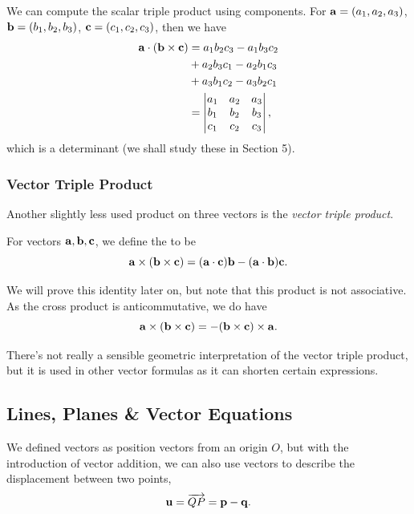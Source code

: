 \documentclass[a4paper]{scrartcl}
\begin{document}
We can compute the scalar triple product using components. For $\mathbf{a} = (a_1, a_2, a_3)$, $\mathbf{b} = (b_1, b_2, b_3)$, $\mathbf{c} = (c_1, c_2, c_3)$, then we have
\begin{align*}
    \mathbf{a} \cdot (\mathbf{b} \times \mathbf{c}) &= a_1 b_2 c_3 - a_1 b_3 c_2 \\
    & + a_2 b_3 c_1 - a_2 b_1 c_3 \\
    & + a_3 b_1 c_2 - a_3 b_2 c_1 \\
    &= \begin{vmatrix}
        a_1 & a_2 & a_3 \\
        b_1 & b_2 & b_3 \\
        c_1 & c_2 & c_3 
    \end{vmatrix},
\end{align*}
which is a determinant (we shall study these in Section 5).

\subsubsection{Vector Triple Product}

Another slightly less used product on three vectors is the \emph{vector triple product}.

\begin{definition}
    For vectors $\mathbf{a}, \mathbf{b}, \mathbf{c}$, we define the  to be
    $$
    \mathbf{a} \times(\mathbf{b} \times \mathbf{c})=(\mathbf{a} \cdot \mathbf{c}) \mathbf{b}-(\mathbf{a} \cdot \mathbf{b}) \mathbf{c}.
    $$
\end{definition}

We will prove this identity later on, but note that this product is not associative. As the cross product is anticommutative, we do have
$$
\mathbf{a} \times(\mathbf{b} \times \mathbf{c}) = - (\mathbf{b} \times \mathbf{c}) \times \mathbf{a}.
$$

There's not really a sensible geometric interpretation of the vector triple product, but it is used in other vector formulas as it can shorten certain expressions.

\subsection{Lines, Planes \& Vector Equations}

We defined vectors as position vectors from an origin $O$, but with the introduction of vector addition, we can also use vectors to describe the displacement between two points,
$$
\mathbf{u} = \overrightarrow{QP} = \mathbf{p} - \mathbf{q}.
$$
\end{document}
